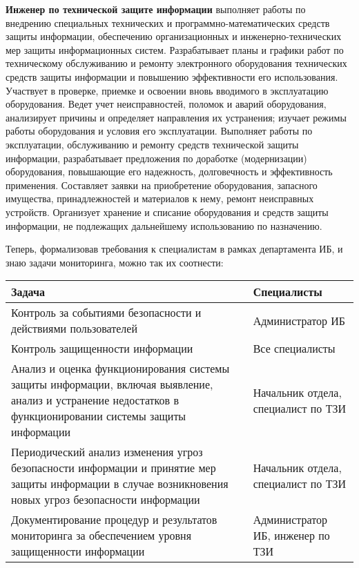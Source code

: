 \textbf{Инженер по технической защите информации} выполняет работы по внедрению специальных технических и программно-математических средств защиты информации, обеспечению организационных и инженерно-технических мер защиты информационных систем. Разрабатывает планы и графики работ по техническому обслуживанию и ремонту электронного оборудования технических средств защиты информации и повышению эффективности его использования. Участвует в проверке, приемке и освоении вновь вводимого в эксплуатацию оборудования. Ведет учет неисправностей, поломок и аварий оборудования, анализирует причины и определяет направления их устранения; изучает режимы работы оборудования и условия его эксплуатации. Выполняет работы по эксплуатации, обслуживанию и ремонту средств технической защиты информации, разрабатывает предложения по доработке (модернизации) оборудования, повышающие его надежность, долговечность и эффективность применения. Составляет заявки на приобретение оборудования, запасного имущества, принадлежностей и материалов к нему, ремонт неисправных устройств. Организует хранение и списание оборудования и средств защиты информации, не подлежащих дальнейшему использованию по назначению.


Теперь, формализовав требования к специалистам в рамках департамента ИБ, и знаю задачи мониторинга, можно так их соотнести:

\begin{table}[H]
	\centering
	\begin{tabular}{|p{10cm}|p{4cm}|}
		\hline
		\textbf{Задача}                                                                                                                                             & \textbf{Специалисты}                \\ \hline
		Контроль за событиями безопасности и действиями пользователей                                                                                               & Администратор ИБ                   \\ \hline
		Контроль защищенности информации                                                                                                                            & Все специалисты                     \\ \hline
		Анализ и оценка функционирования системы защиты информации, включая выявление, анализ и устранение недостатков в функционировании системы защиты информации & Начальник отдела, специалист по ТЗИ \\ \hline
		Периодический анализ изменения угроз безопасности информации и принятие мер защиты информации в случае возникновения новых угроз безопасности информации    & Начальник отдела, специалист по ТЗИ \\ \hline
		Документирование процедур и результатов мониторинга за обеспечением уровня защищенности информации                                                          & Администратор ИБ, инженер по ТЗИ    \\ \hline
	\end{tabular}
\end{table}



